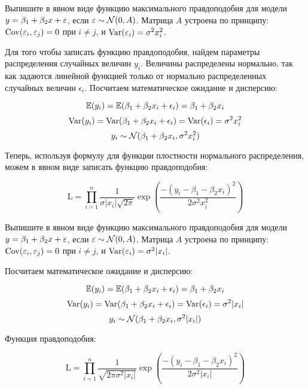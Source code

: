 \begin{problem}
Выпишите в явном виде функцию максимального правдоподобия для модели $y=\beta_1+\beta_2 x+\varepsilon$, если $\varepsilon\sim \mathcal{N}(0,A)$.
Матрица $A$ устроена по принципу: $\operatorname{Cov}(\varepsilon_i,\varepsilon_j)=0$ при $i\neq j$, и $\operatorname{Var}(\varepsilon_i)=\sigma^2 x_i^2$.


\begin{sol}
Для того чтобы записать функцию правдоподобия, найдем параметры распределения случайных величин $y_i$. Величины распределены нормально, так как задаются линейной функцией только от нормально распределенных случайных величин $\epsilon_i$. Посчитаем математическое ожидание и дисперсию:

\[\mathbb{E}(y_i) = \mathbb{E}(\beta_1 + \beta_2x_i + \epsilon_i) = \beta_1 + \beta_2x_i\]
\[\operatorname{Var}(y_i)= \operatorname{Var}(\beta_1 + \beta_2x_i + \epsilon_i) = \operatorname{Var}(\epsilon_i) = \sigma^2x_i^2\]
\[y_i \sim \mathcal{N}(\beta_1 + \beta_2x_i, \sigma^2x_i^2)\]

Теперь, используя формулу для функции плостности нормального распределения, можем в явном виде записать функцию правдоподобия:

\[\text{L} = \prod_{i=1}^{n} \frac{1}{\sigma |x_i|\sqrt{2\pi}}\exp\left( \frac{-(y_i - \beta_1 - \beta_2x_i)^2}{2\sigma^2x_i^2}\right) \]

\end{sol}
\end{problem}


\begin{problem}
Выпишите в явном виде функцию максимального правдоподобия для модели $y=\beta_1+\beta_2 x+\varepsilon$, если $\varepsilon\sim \mathcal{N}(0,A)$.
Матрица $A$ устроена по принципу: $\operatorname{Cov}(\varepsilon_i,\varepsilon_j)=0$ при $i\neq j$, и $\operatorname{Var}(\varepsilon_i)=\sigma^2 |x_i|$.


\begin{sol}
Посчитаем математическое ожидание и дисперсию:

\[\mathbb{E}(y_i) = \mathbb{E}(\beta_1 + \beta_2x_i + \epsilon_i) = \beta_1 + \beta_2x_i\]
\[\operatorname{Var}(y_i)= \operatorname{Var}(\beta_1 + \beta_2x_i + \epsilon_i) = \operatorname{Var}(\epsilon_i) = \sigma^2|x_i|\]
\[y_i \sim \mathcal{N}(\beta_1 + \beta_2x_i, \sigma^2|x_i|)\]

Функция правдоподобия:

\[\text{L} = \prod_{i=1}^{n} \frac{1}{\sqrt{2\pi \sigma^2|x_i|}}\exp\left( \frac{-(y_i - \beta_1 - \beta_2x_i)^2}{2\sigma^2|x_i|}\right) \]
\end{sol}
\end{problem}



